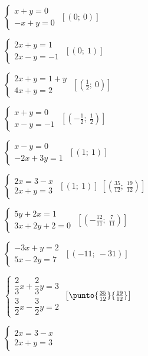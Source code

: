 \begin{esercizio}[\Ast]
\begin{multicols}{2}
\begin{enumeratea}
 \item $\left\{\begin{array}{l}x+y=0\\-x+y=0\end{array}\right.$
 \hfill $\left[(0;~0)\right]$
 \item $\left\{\begin{array}{l}2x+y=1 \\2x-y=-1\end{array}\right.$
 \hfill $\left[(0;~1)\right]$
 \item $\left\{\begin{array}{l}2x+y=1+y\\4x+y=2\end{array}\right.$
 \hfill $\left[\left(\frac{1}{2};~0\right)\right]$
 \item $\left\{\begin{array}{l}x+y=0\\x-y=-1\end{array}\right.$
 \hfill $\left[\left(-{\frac{1}{2}};~\frac{1}{2}\right)\right]$
 \item $\left\{\begin{array}{l}x-y=0\\-2x+3y=1\end{array}\right.$
 \hfill $\left[(1;~1)\right]$
 \item $\left\{\begin{array}{l}2x=3-x\\2x+y=3\end{array}\right.$
 \hfill $\left[(1;~1)\right]$
 \hfill $\left[\left(\frac{35}{12};~\frac{19}{12}\right)\right]$
 \item $\left\{\begin{array}{l}5y+2x=1 \\3x+2y+2=0\end{array}\right.$
 \hfill $\left[\left(-{\frac{12}{11}};~\frac{7}{11}\right)\right]$
 \item $\left\{\begin{array}{l}-3x+y=2\\5x-2y=7\end{array}\right.$
 \hfill $\left[(-11;~-31)\right]$
 \item $\left\{\begin{array}{l}
 \dfrac{2}{3}x+\dfrac{2}{3}y=3\\
 \dfrac{3}{2}x-\dfrac{3}{2}y=2\end{array}\right.$
 \hfill $\left[\punto{\frac{35}{12}}{\frac{19}{12}}\right]$
 \item $\left\{\begin{array}{l}2x=3-x\\2x+y=3\end{array}\right.$

\end{enumeratea}
\end{multicols}
\end{esercizio}
